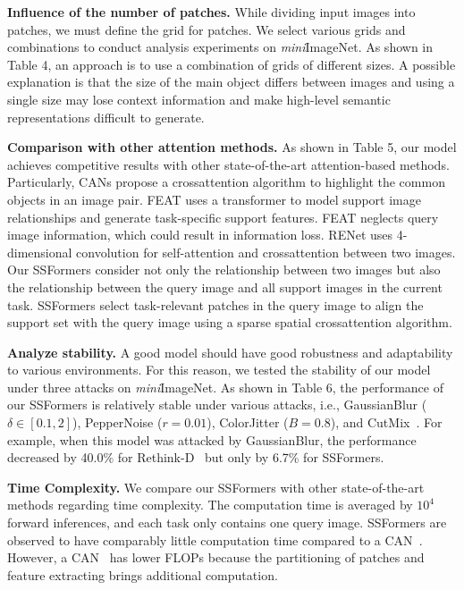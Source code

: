 \documentclass{SCIS2019}
\begin{document}
\textbf{Influence of the number of patches.}
While dividing input images into patches, we must define the grid for patches. We select various grids and combinations to conduct analysis experiments on \emph{mini}ImageNet. As shown in Table 4, an approach is to use a combination of grids of different sizes. A possible explanation is that the size of the main object differs between images and using a single size may lose context information and make high-level semantic representations difficult to generate. 

\textbf{Comparison with other attention methods.}
As shown in Table 5, our model achieves competitive results with other state-of-the-art attention-based methods. Particularly, CANs propose a crossattention algorithm to highlight the common objects in an image pair. FEAT uses a transformer to model support image relationships and generate task-specific support features. FEAT neglects query image information, which could result in information loss. RENet uses 4-dimensional convolution for self-attention and crossattention between two images. Our SSFormers consider not only the relationship between two images but also the relationship between the query image and all support images in the current task. SSFormers select task-relevant patches in the query image to align the support set with the query image using a sparse spatial crossattention algorithm.

\textbf{Analyze stability.}
A good model should have good robustness and adaptability to various environments. For this reason, we tested the stability of our model under three attacks on \emph{mini}ImageNet. As shown in Table 6, the performance of our SSFormers is relatively stable under various attacks, i.e., GaussianBlur ($\delta\in\left[0.1, 2\right]$), PepperNoise ($r=0.01$), ColorJitter ($B=0.8$), and CutMix~\cite{45}. For example, when this model was attacked by GaussianBlur, the performance decreased by 40.0\% for Rethink-D~\cite{40} but only by 6.7\% for SSFormers.

\textbf{Time Complexity.} We compare our SSFormers with other state-of-the-art methods regarding time complexity. The computation time is averaged by $10^4$ forward inferences, and each task only contains one query image. SSFormers are observed to have comparably little computation time compared to a CAN~\cite{14}. However, a CAN~\cite{14} has lower FLOPs because the partitioning of patches and feature extracting brings additional computation.
\end{document}
